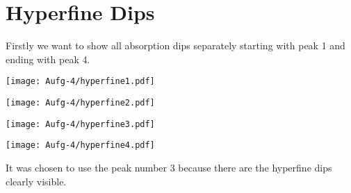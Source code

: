 \section{Hyperfine Dips}
\label{sec:hyperfine}
Firstly we want to show all absorption dips separately starting with peak 1 and ending with peak 4.
\begin{center}
    \texttt{[image: Aufg-4/hyperfine1.pdf]}
    \label{image:peak1}
\end{center}
\begin{center}
    \texttt{[image: Aufg-4/hyperfine2.pdf]}
    \label{image:peak2}
\end{center}
\begin{center}
    \texttt{[image: Aufg-4/hyperfine3.pdf]}
    \label{image:peak3}
\end{center}
\begin{center}
    \texttt{[image: Aufg-4/hyperfine4.pdf]}
    \label{image:peak4}
\end{center}
\newpage
It was chosen to use the peak number 3 because there are the hyperfine dips clearly visible.
